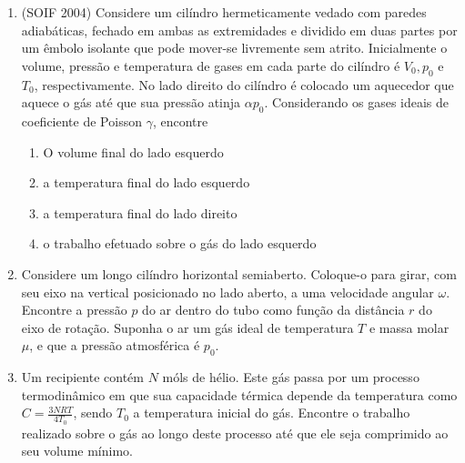 \begin{enumerate}
    \item
        (SOIF 2004) Considere um cilíndro hermeticamente vedado com paredes
        adiabáticas, fechado em ambas as extremidades e dividido em duas partes
        por um êmbolo isolante que pode mover-se livremente sem atrito.
        Inicialmente o volume, pressão e temperatura de gases em cada parte do
        cilíndro é $V_0,p_0$ e $T_0$, respectivamente. No lado direito do
        cilíndro é colocado um aquecedor que aquece o gás até que sua pressão
        atinja $\alpha p_0$. Considerando os gases ideais de coeficiente de
        Poisson $\gamma$, encontre
        \begin{enumerate}
            \item
                O volume final do lado esquerdo
            \item
                a temperatura final do lado esquerdo
            \item
                a temperatura final do lado direito
            \item
                o trabalho efetuado sobre o gás do lado esquerdo
        \end{enumerate}

    \item
        Considere um longo cilíndro horizontal semiaberto. Coloque-o para girar,
        com seu eixo na vertical posicionado no lado aberto, a uma velocidade
        angular $\omega$. Encontre a pressão $p$ do ar dentro do tubo como
        função da distância $r$ do eixo de rotação. Suponha o ar um gás ideal de
        temperatura $T$ e massa molar $\mu$, e que a pressão atmosférica é $p_0$.

    \item
        Um recipiente contém $N$ móls de hélio. Este gás passa por um processo
        termodinâmico em que sua capacidade térmica depende da temperatura como
        $C=\frac{3NRT}{4T_0}$, sendo $T_0$ a temperatura inicial do gás.
        Encontre o trabalho realizado sobre o gás ao longo deste processo até
        que ele seja comprimido ao seu volume mínimo.


\end{enumerate}
